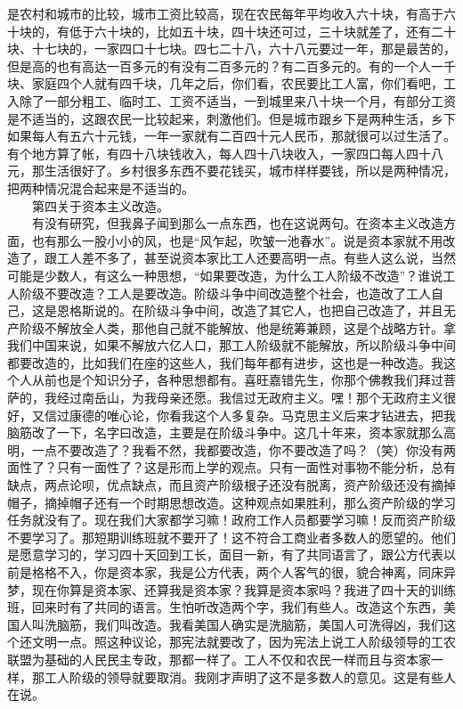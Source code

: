 \documentclass[cn,11pt,chinese]{elegantbook}
\begin{document}
是农村和城市的比较，城市工资比较高，现在农民每年平均收入六十块，有高于六十块的，有低于六十块的，比如五十块，四十块还可过，三十块就差了，还有二十块、十七块的，一家四口十七块。四七二十八，六十八元要过一年，那是最苦的，但是高的也有高达一百多元的有没有二百多元的？有二百多元的。有的一个人一千块、家庭四个人就有四千块，几年之后，你们看，农民要比工人富，你们看吧，工入除了一部分粗工、临时工、工资不适当，一到城里来八十块一个月，有部分工资是不适当的，这跟农民一比较起来，刺激他们。但是城市跟乡下是两种生活，乡下如果每人有五六十元钱，一年一家就有二百四十元人民币，那就很可以过生活了。有个地方算了帐，有四十八块钱收入，每人四十八块收入，一家四口每人四十八元，那生活很好了。乡村很多东西不要花钱买，城市样样要钱，所以是两种情况，把两种情况混合起来是不适当的。\\
　　第四关于资本主义改造。\\
　　有没有研究，但我鼻子闻到那么一点东西，也在这说两句。在资本主义改造方面，也有那么一股小小的风，也是“风乍起，吹皱一池春水”。说是资本家就不用改造了，跟工人差不多了，甚至说资本家比工人还要高明一点。有些人这么说，当然可能是少数人，有这么一种思想，“如果要改造，为什么工人阶级不改造”？谁说工人阶级不要改造？工人是要改造。阶级斗争中间改造整个社会，也造改了工人自己，这是恩格斯说的。在阶级斗争中间，改造了其它人，也把自己改造了，并且无产阶级不解放全人类，那他自己就不能解放、他是统筹兼顾，这是个战略方针。拿我们中国来说，如果不解放六亿人口，那工人阶级就不能解放，所以阶级斗争中间都要改造的，比如我们在座的这些人，我们每年都有进步，这也是一种改造。我这个人从前也是个知识分子，各种思想都有。喜旺嘉错先生，你那个佛教我们拜过菩萨的，我经过南岳山，为我母亲还愿。我信过无政府主义。嘿！那个无政府主义很好，又信过康德的唯心论，你看我这个人多复杂。马克思主义后来才钻进去，把我脑筋改了一下，名字曰改造，主要是在阶级斗争中。这几十年来，资本家就那么高明，一点不要改造了？我看不然，我都要改造，你不要改造了吗？（笑）你没有两面性了？只有一面性了？这是形而上学的观点。只有一面性对事物不能分析，总有缺点，两点论呗，优点缺点，而且资产阶级根子还没有脱离，资产阶级还没有摘掉帽子，摘掉帽子还有一个时期思想改造。这种观点如果胜利，那么资产阶级的学习任务就没有了。现在我们大家都学习嘛！政府工作人员都要学习嘛！反而资产阶级不要学习了。那短期训练班就不要开了！这不符合工商业者多数人的愿望的。他们是愿意学习的，学习四十天回到工长，面目一新，有了共同语言了，跟公方代表以前是格格不入，你是资本家，我是公方代表，两个人客气的很，貌合神离，同床异梦，现在你算是资本家、还算我是资本家？我算是资本家吗？我进了四十天的训练班，回来时有了共同的语言。生怕听改造两个字，我们有些人。改造这个东西，美国人叫洗脑筋，我们叫改造。我看美国人确实是洗脑筋，美国人可洗得凶，我们这个还文明一点。照这种议论，那宪法就要改了，因为宪法上说工人阶级领导的工农联盟为基础的人民民主专政，那都一样了。工人不仅和农民一样而且与资本家一样，那工人阶级的领导就要取消。我刚才声明了这不是多数人的意见。这是有些人在说。\\
\end{document}

